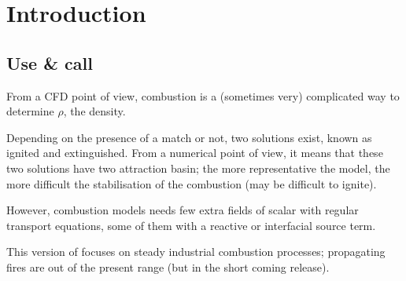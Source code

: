 
%
%
%
%


\section{Introduction}\label{sec:combbase}

\subsection{Use \& call}


From a CFD point of view, combustion is a (sometimes very) complicated way to
determine $\rho$, the density.

Depending on the presence of a match or not, two solutions exist, known as
ignited and extinguished. From a numerical point of view, it means that these
two solutions have two attraction basin; the more representative the model, the more difficult the stabilisation of the combustion (may be difficult to
ignite).

However, combustion models needs few extra fields of scalar with regular
transport equations, some of them with a reactive or interfacial source term.

This version of \CS focuses on steady industrial combustion processes;
propagating fires are out of the present range (but  in the short coming release).

